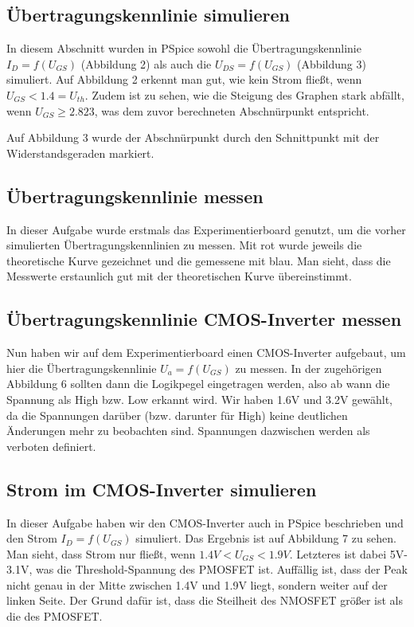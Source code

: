 \documentclass[12pt,a4paper]{scrartcl}
\begin{document}
\subsection{\"Ubertragungskennlinie simulieren}
In diesem Abschnitt wurden in PSpice sowohl die \"Ubertragungskennlinie $I_D=f(U_{GS})$ (Abbildung 2) als auch die $U_{DS}=f(U_{GS})$ (Abbildung 3) simuliert.
Auf Abbildung 2 erkennt man gut, wie kein Strom flie\ss t, wenn $U_{GS} < 1.4=U_{th}$.
Zudem ist zu sehen, wie die Steigung des Graphen stark abf\"allt, wenn $U_{GS} \geq 2.823$, was dem zuvor berechneten Abschn\"urpunkt entspricht.

Auf Abbildung 3 wurde der Abschn\"urpunkt durch den Schnittpunkt mit der Widerstandsgeraden markiert.

\subsection{\"Ubertragungskennlinie messen}
In dieser Aufgabe wurde erstmals das Experimentierboard genutzt, um die vorher simulierten \"Ubertragungskennlinien zu messen.
Mit rot wurde jeweils die theoretische Kurve gezeichnet und die gemessene mit blau.
Man sieht, dass die Messwerte erstaunlich gut mit der theoretischen Kurve \"ubereinstimmt.

\subsection{\"Ubertragungskennlinie CMOS-Inverter messen}
Nun haben wir auf dem Experimentierboard einen CMOS-Inverter aufgebaut, um hier die \"Ubertragungskennlinie $U_a=f(U_{GS})$ zu messen.
In der zugeh\"origen Abbildung 6 sollten dann die Logikpegel eingetragen werden, also ab wann die Spannung als High bzw. Low erkannt wird.
Wir haben 1.6V und 3.2V gew\"ahlt, da die Spannungen dar\"uber (bzw. darunter f\"ur High) keine deutlichen \"Anderungen mehr zu beobachten sind.
Spannungen dazwischen werden als verboten definiert.

\subsection{Strom im CMOS-Inverter simulieren}
In dieser Aufgabe haben wir den CMOS-Inverter auch in PSpice beschrieben und den Strom $I_D=f(U_{GS})$ simuliert.
Das Ergebnis ist auf Abbildung 7 zu sehen.
Man sieht, dass Strom nur flie\ss t, wenn $1.4V < U_{GS} < 1.9V$.
Letzteres ist dabei 5V-3.1V, was die Threshold-Spannung des PMOSFET ist.
Auff\"allig ist, dass der Peak nicht genau in der Mitte zwischen 1.4V und 1.9V liegt, sondern weiter auf der linken Seite.
Der Grund daf\"ur ist, dass die Steilheit des NMOSFET gr\"o\ss er ist als die des PMOSFET.
\end{document}
